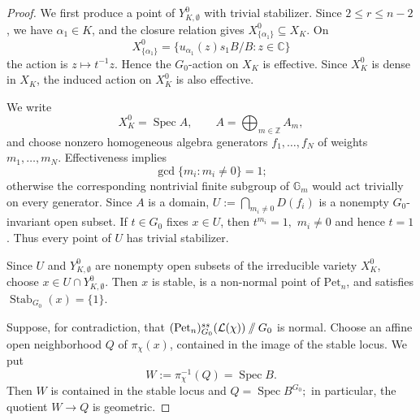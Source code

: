 \documentclass[12pt, reqno]{amsart}
\newcommand{\sslash}{\mathbin{/\mkern-6mu/}}
\theoremstyle{plain}
\numberwithin{equation}{section}
\theoremstyle{definition}
\begin{document}
\begin{proof}
We first produce a point of \(Y^0_{K,\emptyset}\) with trivial
stabilizer. Since \(2\le r\le n-2\), we have \(\alpha_1\in K\), and
the closure relation gives $X_{\{\alpha_1\}}^0\subseteq X_K.$
On
\[
X_{\{\alpha_1\}}^0
=
\{u_{\alpha_1}(z)s_1B/B:z\in\mathbb C\}
\]
the action is $z\longmapsto t^{-1}z.$
Hence the \(G_0\)-action on \(X_K\) is effective. Since \(X_K^0\) is
dense in \(X_K\), the induced action on \(X_K^0\) is also effective.

We write
\[
X_K^0=\operatorname{Spec}A,
\qquad
A=\bigoplus_{m\in\mathbb Z}A_m,
\]
and choose nonzero homogeneous algebra generators
\(f_1,\ldots,f_N\) of weights \(m_1,\ldots,m_N\).
Effectiveness implies
\[
\gcd\{m_i:m_i\neq0\}=1;
\]
otherwise the corresponding nontrivial finite subgroup of
\(\mathbb G_m\) would act trivially on every generator.
Since \(A\) is a domain, $U:=
\bigcap_{m_i\neq0}D(f_i)$ is a nonempty \(G_0\)-invariant open subset. If \(t\in G_0\) fixes
\(x\in U\), then $t^{m_i}=1, \,\, m_i\neq0$
and hence \(t=1\). Thus every point of \(U\) has trivial stabilizer.

Since \(U\) and \(Y^0_{K,\emptyset}\) are nonempty open subsets of
the irreducible variety \(X_K^0\), choose $x\in U\cap Y^0_{K,\emptyset}.$
Then \(x\) is stable, is a non-normal point of \(\mathrm{Pet}_n\),
and satisfies $\operatorname{Stab}_{G_0}(x)=\{1\}.$

Suppose, for contradiction, that $(\mathrm{Pet}_n)^{ss}_{G_0}(\mathcal L(\chi))
\sslash G_0$
is normal. Choose an affine open neighborhood \(Q\) of
\(\pi_\chi(x)\), contained in the image of the stable locus. We put
\[
W:=\pi_\chi^{-1}(Q)=\operatorname{Spec}B.
\]
Then \(W\) is contained in the stable locus and $Q=\operatorname{Spec}B^{G_0};$
in particular, the quotient \(W\to Q\) is geometric.


\end{proof}
\end{document}
